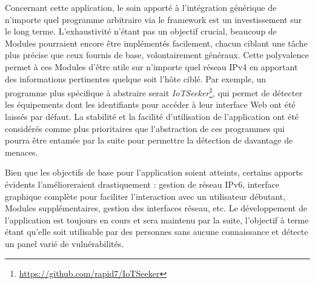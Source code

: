 \documentclass[]{article}
\begin{document}
\par Concernant cette application, le soin apporté à l'intégration générique de n'importe quel programme arbitraire via le framework est un investissement sur le long terme. L'exhaustivité n'étant pas un objectif crucial, beaucoup de Modules pourraient encore être implémentés facilement, chacun ciblant une tâche plus précise que ceux fournis de base, volontairement généraux. Cette polyvalence permet à ces Modules d'être utile sur n'importe quel réseau IPv4 en apportant des informations pertinentes quelque soit l'hôte ciblé. Par exemple, un programme plus spécifique à abstraire serait \textit{IoTSeeker}\footnote{\url{https://github.com/rapid7/IoTSeeker}}, qui permet de détecter les équipements dont les identifiants pour accéder à leur interface Web ont été laissés par défaut. La stabilité et la facilité d'utilisation de l'application ont été considérés comme plus prioritaires que l'abstraction de ces programmes qui pourra être entamée par la suite pour permettre la détection de davantage de menaces.\\

\par Bien que les objectifs de base pour l'application soient atteints, certains apports évidents l'amélioreraient drastiquement : gestion de réseau IPv6, interface graphique complète pour faciliter l'interaction avec un utilisateur débutant, Modules supplémentaires, gestion des interfaces réseau, etc. Le développement de l'application est toujours en cours et sera maintenu par la suite, l'objectif à terme étant qu'elle soit utilisable par des personnes sans aucune connaissance et détecte un panel varié de vulnérabilités.

\newpage



\end{document}
